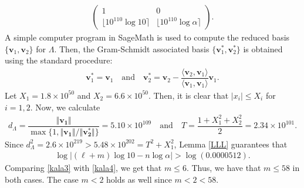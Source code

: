 \documentclass[10pt,a4paper]{article}
\begin{document}
\begin{align*}
\begin{pmatrix}
1&0\\ \lfloor   10^{110}\log 10\rceil & \lfloor  10^{110} \log \alpha \rceil
\end{pmatrix}.
\end{align*}
A simple computer program in SageMath is used to compute the  reduced basis $ \{\mathbf{v}_1, \mathbf{v}_2\} $ for $ \Lambda $. 
Then, the Gram-Schmidt associated basis $ \{\mathbf{v}_1^{*}, \mathbf{v}_2^{*}\} $ is obtained using the standard procedure:
\begin{align*}
\mathbf{v}_1^{*}=\mathbf{v}_1 \quad \text{and} \quad \mathbf{v}_2^{*}=\mathbf{v}_2-\dfrac{\langle \mathbf{v}_2, \mathbf{v}_1\rangle}{\langle \mathbf{v}_1, \mathbf{v}_1 \rangle}\mathbf{v}_1.
\end{align*}
Let $ X_1=1.8\times 10^{50} $ and $ X_2=6.6\times 10^{50} $. Then, it is clear that $ |x_i|\le X_i $ for $ i=1,2 $. Now, we calculate 
\begin{align*}
d_\Lambda= \dfrac{\Vert \mathbf{v_1} \Vert}{\max\{1,\Vert \mathbf{v_1} \Vert/\Vert \mathbf{v_2^*} \Vert \}}=5.10\times 10^{109} \quad \text{and} \quad T=\dfrac{1+X_1^2+X_2^2}{2}=2.34\times 10^{101}.
\end{align*}
Since $ d_\Lambda^2=2.6\times 10^{219}>5.48\times 10^{202}=T^2+X_1^2 $, 
Lemma \ref{LLL} guarantees that 
\begin{align}\label{kala4}
\log \left|(\ell+m)\log 10 - n\log\alpha \right| > \log(0.0000512). 
\end{align}
Comparing \eqref{kala3} with \eqref{kala4}, we get that $ m\le 6 $. Thus, we have that $ m\le 58 $ in both cases. The case $ m<2 $ holds as well since $ m<2<58 $.
\end{document}
